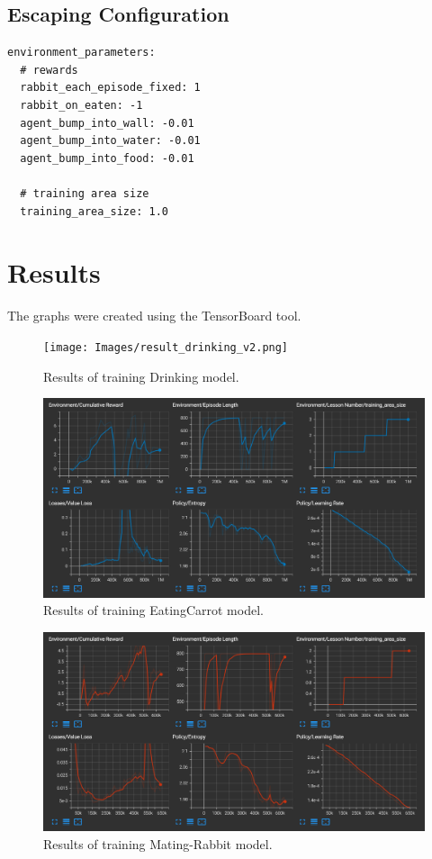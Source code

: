 \subsection{Escaping Configuration}
\begin{lstlisting}
environment_parameters:
  # rewards
  rabbit_each_episode_fixed: 1
  rabbit_on_eaten: -1
  agent_bump_into_wall: -0.01
  agent_bump_into_water: -0.01
  agent_bump_into_food: -0.01

  # training area size
  training_area_size: 1.0
\end{lstlisting}

\section{Results}
The graphs were created using the TensorBoard tool. \cite{TensorboardTool}

\begin{figure}[H]
    \centering
    \texttt{[image: Images/result\_drinking\_v2.png]}
    \caption{Results of training Drinking model.}
    \label{fig:drinkingTrainingResults}
\end{figure}

\begin{figure}
    \centering
    \includegraphics[width=\textwidth]{Images/result_eating_v2.png}
    \caption{Results of training EatingCarrot model.}
    \label{fig:eatingCarrotTrainingResults}
\end{figure}

\begin{figure}
    \centering
    \includegraphics[width=\textwidth]{Images/result_mating_rabbit_v2.png}
    \caption{Results of training Mating-Rabbit model.}
    \label{fig:matingRabbitTrainingResults}
\end{figure}

